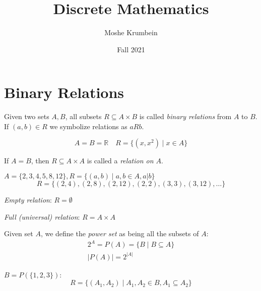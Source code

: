 \documentclass[00_complete]{subfiles}
\title{Discrete Mathematics}
\author{Moshe Krumbein}
\date{Fall 2021}
\begin{document}

\section{Binary Relations}
\begin{definition}
Given two sets $A, B$, all subsets $R \subseteq A \times B$ is called
\emph{binary relations} from $A$ to $B$. If $(a,b) \in R$ we symbolize
relations as $aRb$.
\end{definition}

\begin{example}
$$A=B=\mathbb{R} \quad R=\{(x,x^2) \mid x \in A \}$$
\end{example}

\begin{definition}
If $A=B$, then $R \subseteq A \times A$ is called a \emph{relation on $A$}.
\end{definition}

\begin{example}
$A=\{2,3,4,5,8,12\}, R=\{(a,b) \mid a, b \in A, a | b \}$
$$R=\{(2,4), (2,8),(2,12),(2,2),(3,3),(3,12),\ldots \}$$
\end{example}

\begin{definition}
\emph{Empty relation}: $R=\emptyset$
\end{definition}
\begin{definition}
\emph{Full (universal) relation}: $R = A \times A$
\end{definition}
\begin{definition}
Given set $A$, we define the \emph{power set} as being all the subsets of $A$:
\begin{gather*}
2^A = P(A) = \{B \mid B \subseteq A \} \\
|P(A)| = 2^{|A|}
\end{gather*}
\end{definition}
\begin{example}
$B = P(\{1,2,3\})$:
$$R=\{(A_1,A_2) \mid A_1, A_2 \in B, A_1 \subseteq A_2 \}$$
\end{example}
\end{document}
